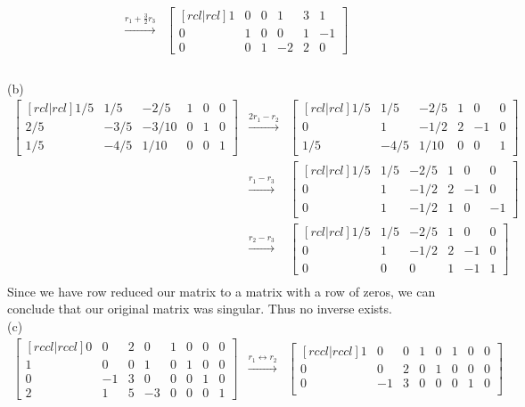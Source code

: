 \begin{solution}
\begin{eqnarray*}
&\xrightarrow[]{r_1 + \frac{3}{2}r_3}&
\begin{bmatrix}[rcl|rcl]
1&0&0&1&3&1\\
0&1&0&0&1&-1\\
0&0&1&-2&2&0
\end{bmatrix}\\
\end{eqnarray*}
\ \\
(b) 
\begin{eqnarray*}
\begin{bmatrix}[rcl|rcl]
1/5&1/5&-2/5&1&0&0\\
2/5&-3/5&-3/10&0&1&0\\
1/5&-4/5&1/10&0&0&1
\end{bmatrix}
&\xrightarrow[]{2r_1 - r_2}&
\begin{bmatrix}[rcl|rcl]
1/5&1/5&-2/5&1&0&0\\
0&1&-1/2&2&-1&0\\
1/5&-4/5&1/10&0&0&1
\end{bmatrix}\\
&\xrightarrow[]{r_1 - r_3}&
\begin{bmatrix}[rcl|rcl]
1/5&1/5&-2/5&1&0&0\\
0&1&-1/2&2&-1&0\\
0&1&-1/2&1&0&-1
\end{bmatrix}\\
&\xrightarrow[]{r_2 - r_3}&
\begin{bmatrix}[rcl|rcl]
1/5&1/5&-2/5&1&0&0\\
0&1&-1/2&2&-1&0\\
0&0&0&1&-1&1
\end{bmatrix}\\
\end{eqnarray*}
Since we have row reduced our matrix to a matrix with a row of zeros, we can conclude that our original matrix was singular. Thus no inverse exists.
\ \\
(c) 
\begin{eqnarray*}
\begin{bmatrix}[rccl|rccl]
0&0&2&0&1&0&0&0\\
1&0&0&1&0&1&0&0\\
0&-1&3&0&0&0&1&0\\
2&1&5&-3&0&0&0&1
\end{bmatrix}
&\xrightarrow[]{r_1 \leftrightarrow r_2}&
\begin{bmatrix}[rccl|rccl]
1&0&0&1&0&1&0&0\\
0&0&2&0&1&0&0&0\\
0&-1&3&0&0&0&1&0\\

\end{bmatrix}
\end{eqnarray*}
\end{solution}
